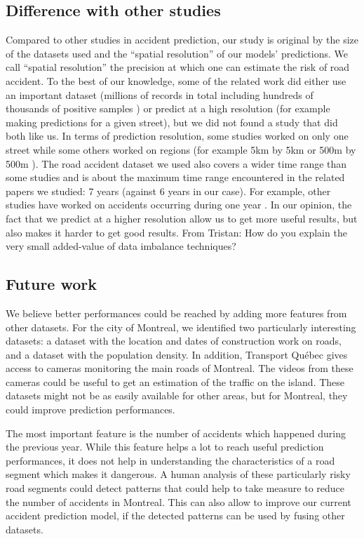 \documentclass[conference]{IEEEtran}
\newcommand{\TG}[1]{\colorlet{saved}{.}\color{orange}From Tristan: #1\color{saved}}
\begin{document}
\subsection{Difference with other studies}
Compared to other studies in accident prediction, our study is original by the size of the datasets used and the ``spatial resolution'' of our models' predictions. We call ``spatial resolution'' the precision at which one can estimate the risk of road accident. To the best of our knowledge, some of the related work did either use an important dataset (millions of records in total including hundreds of thousands of positive samples \cite{QChen2016}) or predict at a high resolution (for example making predictions for a given street), but we did not found a study that did both like us. In terms of prediction resolution, some studies worked on only one street \cite{Chang2005} \cite{Chang2005b} \cite{Lin2015} while some others worked on regions (for example 5km by 5km \cite{QChen2016} or 500m by 500m \cite{Yuan2018}). The road accident dataset we used also covers a wider time range than some studies and is about the maximum time range encountered in the related papers we studied: 7 years \cite{Yuan2018} (against 6 years in our case). For example, other studies have worked on accidents occurring during one year \cite{Chang2005} \cite{Chang2005b} \cite{QChen2016} \cite{Lin2015}. In our opinion, the fact that we predict at a higher resolution allow us to get more useful results, but also makes it harder to get good results.
\TG{How do you explain the very small added-value of data imbalance techniques?}

\subsection{Future work}

We believe better performances could be reached by adding more features
from other datasets. For the city of Montreal, we identified two
particularly interesting datasets: a dataset with the location and dates of
construction work on roads, and a dataset with the population density.
In addition, Transport Qu\'ebec gives access to cameras monitoring the main
roads of Montreal. The videos from these cameras could be useful to get an
estimation of the traffic on the island. These datasets might not be as
easily available for other areas, but for Montreal, they could improve 
prediction performances.

The most important feature is the number of accidents which happened during
the previous year. While this feature helps a lot to reach useful prediction
performances, it does not help in understanding the characteristics of a
road segment which makes it dangerous. A human analysis of these
particularly risky road segments could detect patterns that could help to
take measure to reduce the number of accidents in Montreal. This can also
allow to improve our current accident prediction model, if the detected
patterns can be used by fusing other datasets.
\end{document}
